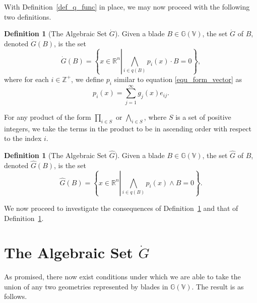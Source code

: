 \documentclass{birkjour}
\theoremstyle{definition}
\newtheorem{defn}[thm]{Definition}
\theoremstyle{remark}
\numberwithin{equation}{section}
\newcommand{\G}{\mathbb{G}}
\newcommand{\V}{\mathbb{V}}
\newcommand{\R}{\mathbb{R}}
\newcommand{\Z}{\mathbb{Z}}
\newcommand{\Gi}{\dot{G}}
\newcommand{\Go}{\hat{G}}
\begin{document}
With Definition~\ref{def_q_func} in place, we may now proceed with the following two definitions.

\begin{defn}[The Algebraic Set $\Gi$]\label{def_gi}
Given a blade $B\in\G(\V)$, the set $\Gi$ of $B$, denoted $\Gi(B)$, is the set
\begin{equation}
\Gi(B) = \left\{x\in\R^n\left|\bigwedge_{i\in q(B)} p_i(x)\cdot B=0\right.\right\},
\end{equation}
where for each $i\in\Z^+$, we define $p_i$ similar to equation \eqref{equ_form_vector} as
\begin{equation}\label{equ_pi_func}
p_i(x) = \sum_{j=1}^\infty g_j(x)e_{ij}.
\end{equation}
\end{defn}
For any product of the form $\prod_{i\in S}$ or $\bigwedge_{i\in S}$, where $S$ is
a set of positive integers, we take the terms in the product to be in ascending order
with respect to the index $i$.

\begin{defn}[The Algebraic Set $\Go$]\label{def_go}
Given a blade $B\in\G(\V)$, the set $\Go$ of $B$, denoted $\Go(B)$, is the set
\begin{equation}
\Go(B) = \left\{x\in\R^n\left|\bigwedge_{i\in q(B)}p_i(x)\wedge B=0\right.\right\}.
\end{equation}
\end{defn}

We now proceed to investigate the consequences of Definition~\ref{def_gi}
and that of Definition~\ref{def_go}.

\section{The Algebraic Set $\Gi$}

As promised, there now exist conditions under which we are able to take the
union of any two geometries represented by blades in $\G(\V)$.  The result is
as follows.
\end{document}
